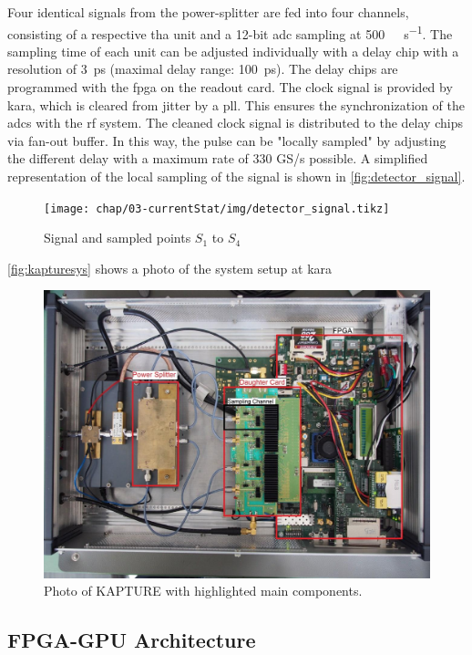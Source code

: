 Four identical signals from the power-splitter are fed into four channels, consisting of a respective \gls{tha} unit and a 12-bit \gls{adc} sampling at \SI{500}{\mega\sample\per\second}. The sampling time of each unit can be adjusted individually with a delay chip with a resolution of \SI{3}{\pico \second} (maximal delay range: \SI{100}{\pico \second}). The delay chips are programmed with the \gls{fpga} on the readout card.
The clock signal is provided by \gls{kara}, which is cleared from jitter by a \gls{pll}. This ensures the synchronization of the \glspl{adc} with the \gls{rf} system. The cleaned clock signal is distributed to the delay chips via fan-out buffer. \cite{caselleKAP}
In this way, the pulse can be "locally sampled" by adjusting the different delay with a maximum rate of 330 GS/s possible. 
A simplified representation of the local sampling of the signal is shown in \autoref{fig:detector_signal}.
\begin{figure}[tbh]
	\centering
	\texttt{[image: chap/03-currentStat/img/detector\_signal.tikz]}
	\caption{Signal and sampled points $S_1$ to $S_4$}
	\label{fig:detector_signal}
\end{figure}

\autoref{fig:kapturesys} shows a photo of the system setup at \gls{kara}
\begin{figure}[tbh]
	\centering
	\includegraphics[width = \textwidth]{chap/03-currentStat/img/kapture_sys}
	\caption{Photo of KAPTURE with highlighted main components. \cite[p.~61]{brosi}}
	\label{fig:kapturesys}
\end{figure}

\subsection{FPGA-GPU Architecture}

